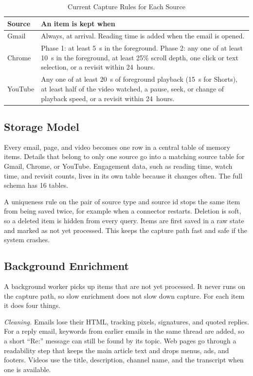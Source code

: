 \documentclass[conference]{IEEEtran}
\begin{document}
\begin{table}[t]
\caption{Current Capture Rules for Each Source}
\label{tab:gates}
\centering
\renewcommand{\arraystretch}{1.15}
\begin{tabular}{|>{\raggedright\arraybackslash}p{1.35cm}|>{\raggedright\arraybackslash}p{6.2cm}|}
\hline
\textbf{Source} & \textbf{An item is kept when} \\
\hline
Gmail & Always, at arrival. Reading time is added when the email is opened. \\
\hline
Chrome & Phase 1: at least 5~s in the foreground. Phase 2: any one of at least 10~s in the foreground, at least 25\% scroll depth, one click or text selection, or a revisit within 24~hours. \\
\hline
YouTube & Any one of at least 20~s of foreground playback (15~s for Shorts), at least half of the video watched, a pause, seek, or change of playback speed, or a revisit within 24~hours. \\
\hline
\end{tabular}
\end{table}

\subsection{Storage Model}
Every email, page, and video becomes one row in a central table of memory items. Details that belong to only one source go into a matching source table for Gmail, Chrome, or YouTube. Engagement data, such as reading time, watch time, and revisit counts, lives in its own table because it changes often. The full schema has 16 tables.

A uniqueness rule on the pair of source type and source id stops the same item from being saved twice, for example when a connector restarts. Deletion is soft, so a deleted item is hidden from every query. Items are first saved in a raw state and marked as not yet processed. This keeps the capture path fast and safe if the system crashes.

\subsection{Background Enrichment}
A background worker picks up items that are not yet processed. It never runs on the capture path, so slow enrichment does not slow down capture. For each item it does four things.

\textit{Cleaning.} Emails lose their HTML, tracking pixels, signatures, and quoted replies. For a reply email, keywords from earlier emails in the same thread are added, so a short ``Re:'' message can still be found by its topic. Web pages go through a readability step that keeps the main article text and drops menus, ads, and footers. Videos use the title, description, channel name, and the transcript when one is available.
\end{document}
